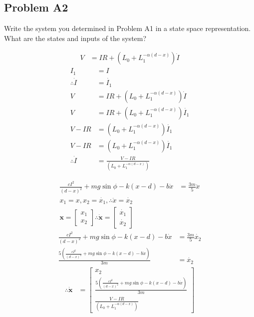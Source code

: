 \subsection*{Problem A2}
    Write the system you determined in Problem A1 in a state space representation. What are the states and inputs of the system?

    \begin{align}
        V &= IR + (L_{0} + L_{1} ^{- \alpha (d - x)})\dot{I}
    \end{align}
    \begin{align}
        I_1 &= I\nonumber\\
        \therefore \dot{I} &= \dot{I_1}\nonumber\\
        V &= IR + (L_{0} + L_{1} ^{- \alpha (d - x)})\dot{I}\nonumber\\
        V &= IR + (L_{0} + L_{1} ^{- \alpha (d - x)})\dot{I_1}\nonumber\\
        V - IR &= (L_{0} + L_{1} ^{- \alpha (d - x)})\dot{I_1}\nonumber\\
        V - IR &= (L_{0} + L_{1} ^{- \alpha (d - x)})\dot{I_1}\nonumber\\
        \therefore
        \dot{I} &= \frac{V - IR}{(L_{0} + L_{1} ^{- \alpha (d - x)})}
    \end{align}


    \begin{align}
        \frac{c I^2}{(d - x)^2} + mg \sin{\phi} - k(x -d) - b \dot{x} &= \frac{3m}{5} \ddot{x} \\
        x_1 = x, x_2 = \dot{x_1}, \therefore \ddot{x} = \dot{x_2}\nonumber\\
        \bm{x} =
        \begin{bmatrix}
            x_1
            \\
            x_2
        \end{bmatrix}
        \therefore \bm{\dot{x}} =
        \begin{bmatrix}
            \dot{x_1}
            \\
            \dot{x_2}
        \end{bmatrix} \nonumber
    \end{align}
    \begin{align}
        \frac{c I^2}{(d - x)^2} + mg \sin{\phi} - k(x -d) - b \dot{x} &= \frac{3m}{5} \dot{x_2} \nonumber\\
        \frac{5(\frac{c I^2}{(d - x)^2} + mg \sin{\phi} - k(x -d) - b \dot{x})}{3m} &= \dot{x_2} \nonumber
    \end{align}
    \begin{align}
        \therefore \bm{\dot{x}} &=
        \begin{bmatrix}
            x_2
            \\
            \frac{5(\frac{c I^2}{(d - x)^2} + mg \sin{\phi} - k(x -d) - b \dot{x})}{3m}
            \\
            \frac{V - IR}{(L_{0} + L_{1} ^{- \alpha (d - x)})}
        \end{bmatrix}
    \end{align}




